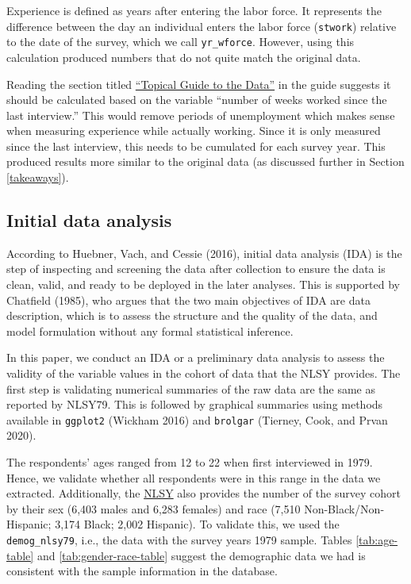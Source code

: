 \documentclass{article}
\begin{document}
Experience is defined as years after entering the labor force. It represents the difference between the day an individual enters the labor force (\texttt{stwork}) relative to the date of the survey, which we call \texttt{yr\_wforce}. However, using this calculation produced numbers that do not quite match the original data.

Reading the section titled \href{https://www.nlsinfo.org/content/cohorts/nlsy79/topical-guide/employment/work-experience}{``Topical Guide to the Data''} in the guide suggests it should be calculated based on the variable ``number of weeks worked since the last interview.'' This would remove periods of unemployment which makes sense when measuring experience while actually working. Since it is only measured since the last interview, this needs to be cumulated for each survey year. This produced results more similar to the original data (as discussed further in Section \ref{takeaways}).

\hypertarget{ida}{%
\subsection{Initial data analysis}\label{ida}}

According to Huebner, Vach, and Cessie (2016), initial data analysis (IDA) is the step of inspecting and screening the data after collection to ensure the data is clean, valid, and ready to be deployed in the later analyses. This is supported by Chatfield (1985), who argues that the two main objectives of IDA are data description, which is to assess the structure and the quality of the data, and model formulation without any formal statistical inference.

In this paper, we conduct an IDA or a preliminary data analysis to assess the validity of the variable values in the cohort of data that the NLSY provides. The first step is validating numerical summaries of the raw data are the same as reported by NLSY79. This is followed by graphical summaries using methods available in \texttt{ggplot2} (Wickham 2016) and \texttt{brolgar} (Tierney, Cook, and Prvan 2020).

The respondents' ages ranged from 12 to 22 when first interviewed in 1979. Hence, we validate whether all respondents were in this range in the data we extracted. Additionally, the \href{https://www.nlsinfo.org/content/cohorts/nlsy79/intro-to-the-sample/nlsy79-sample-introduction}{NLSY} also provides the number of the survey cohort by their sex (6,403 males and 6,283 females) and race (7,510 Non-Black/Non-Hispanic; 3,174 Black; 2,002 Hispanic). To validate this, we used the \texttt{demog\_nlsy79}, i.e., the data with the survey years 1979 sample. Tables \ref{tab:age-table} and \ref{tab:gender-race-table} suggest the demographic data we had is consistent with the sample information in the database.
\end{document}
